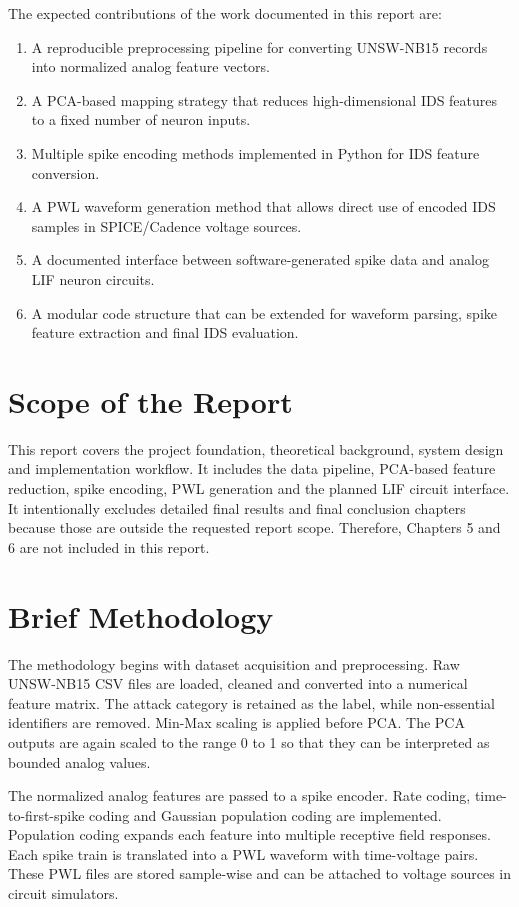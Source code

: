 The expected contributions of the work documented in this report are:
\begin{enumerate}
\item A reproducible preprocessing pipeline for converting UNSW-NB15 records into normalized analog feature vectors.
\item A PCA-based mapping strategy that reduces high-dimensional IDS features to a fixed number of neuron inputs.
\item Multiple spike encoding methods implemented in Python for IDS feature conversion.
\item A PWL waveform generation method that allows direct use of encoded IDS samples in SPICE/Cadence voltage sources.
\item A documented interface between software-generated spike data and analog LIF neuron circuits.
\item A modular code structure that can be extended for waveform parsing, spike feature extraction and final IDS evaluation.
\end{enumerate}

\section[Scope of the Report]{\textbf{Scope of the Report}}

This report covers the project foundation, theoretical background, system design and implementation workflow. It includes the data pipeline, PCA-based feature reduction, spike encoding, PWL generation and the planned LIF circuit interface. It intentionally excludes detailed final results and final conclusion chapters because those are outside the requested report scope. Therefore, Chapters 5 and 6 are not included in this report.

\section[Brief Methodology]{\textbf{Brief Methodology}}

The methodology begins with dataset acquisition and preprocessing. Raw UNSW-NB15 CSV files are loaded, cleaned and converted into a numerical feature matrix. The attack category is retained as the label, while non-essential identifiers are removed. Min-Max scaling is applied before PCA. The PCA outputs are again scaled to the range 0 to 1 so that they can be interpreted as bounded analog values.

The normalized analog features are passed to a spike encoder. Rate coding, time-to-first-spike coding and Gaussian population coding are implemented. Population coding expands each feature into multiple receptive field responses. Each spike train is translated into a PWL waveform with time-voltage pairs. These PWL files are stored sample-wise and can be attached to voltage sources in circuit simulators.

